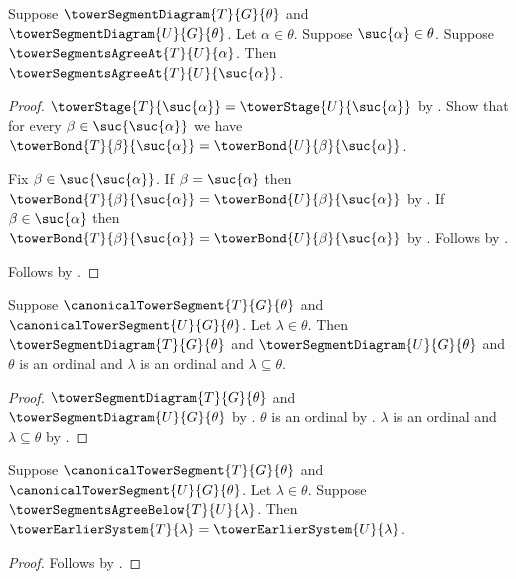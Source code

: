 \begin{proposition}\label{tower_segments_agree_at_successor}
    Suppose $\towerSegmentDiagram{T}{G}{\theta}$ and
        $\towerSegmentDiagram{U}{G}{\theta}$.
    Let $\alpha\in\theta$.
    Suppose $\suc{\alpha}\in\theta$.
    Suppose $\towerSegmentsAgreeAt{T}{U}{\alpha}$.
    Then $\towerSegmentsAgreeAt{T}{U}{\suc{\alpha}}$.
\end{proposition}
\begin{proof}
    $\towerStage{T}{\suc{\alpha}}=
        \towerStage{U}{\suc{\alpha}}$ by
        .
    Show that for every $\beta\in\suc{\suc{\alpha}}$ we have
        $\towerBond{T}{\beta}{\suc{\alpha}}=
            \towerBond{U}{\beta}{\suc{\alpha}}$.
    \begin{subproof}
        Fix $\beta\in\suc{\suc{\alpha}}$.
        If $\beta=\suc{\alpha}$ then
            $\towerBond{T}{\beta}{\suc{\alpha}}=
                \towerBond{U}{\beta}{\suc{\alpha}}$ by
            .
        If $\beta\in\suc{\alpha}$ then
            $\towerBond{T}{\beta}{\suc{\alpha}}=
                \towerBond{U}{\beta}{\suc{\alpha}}$ by
            .
        Follows by .
    \end{subproof}
    Follows by .
\end{proof}

\begin{proposition}\label{canonical_tower_comparison_context}
    Suppose $\canonicalTowerSegment{T}{G}{\theta}$ and
        $\canonicalTowerSegment{U}{G}{\theta}$.
    Let $\lambda\in\theta$.
    Then $\towerSegmentDiagram{T}{G}{\theta}$ and
        $\towerSegmentDiagram{U}{G}{\theta}$ and
        $\theta$ is an ordinal and $\lambda$ is an ordinal and
        $\lambda\subseteq\theta$.
\end{proposition}
\begin{proof}
    $\towerSegmentDiagram{T}{G}{\theta}$ and
        $\towerSegmentDiagram{U}{G}{\theta}$ by
        .
    $\theta$ is an ordinal by
        .
    $\lambda$ is an ordinal and $\lambda\subseteq\theta$ by
        .
\end{proof}

\begin{proposition}\label{canonical_tower_earlier_system_agreement}
    Suppose $\canonicalTowerSegment{T}{G}{\theta}$ and
        $\canonicalTowerSegment{U}{G}{\theta}$.
    Let $\lambda\in\theta$.
    Suppose $\towerSegmentsAgreeBelow{T}{U}{\lambda}$.
    Then $\towerEarlierSystem{T}{\lambda}=
        \towerEarlierSystem{U}{\lambda}$.
\end{proposition}
\begin{proof}
    Follows by
        .
\end{proof}

